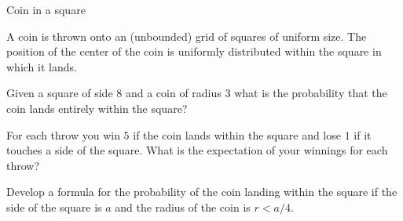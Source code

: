 

\begin{prob}{Coin in a square}

A coin is thrown onto an (unbounded) grid of squares of uniform size. The position of the center of the coin is uniformly distributed within the square in which it lands.

 Given a square of side $8$ and a coin of radius $3$ what is the probability that the coin lands entirely within the square?

 For each throw you win $5$ if the coin lands within the square and lose $1$ if it touches a side of the square. What is the expectation of your winnings for each throw?

 Develop a formula for the probability of the coin landing within the square if the side of the square is $a$ and the radius of the coin is $r<a/4$.
\end{prob}

\solution{}

